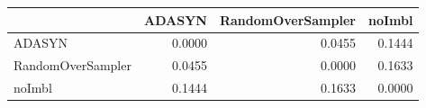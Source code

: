 \begin{tabular}{lrrr}
\toprule
 & ADASYN & RandomOverSampler & noImbl \\
\midrule
ADASYN & 0.0000 & 0.0455 & 0.1444 \\
RandomOverSampler & 0.0455 & 0.0000 & 0.1633 \\
noImbl & 0.1444 & 0.1633 & 0.0000 \\
\bottomrule
\end{tabular}
